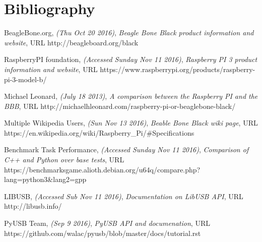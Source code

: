 \documentclass[10pt,draftclsnofoot,onecolumn]{IEEEtran}
\begin{document}
\section{Bibliography}
\begin{thebibliography}{9}

 BeagleBone.org,
\emph{(Thu Oct 20 2016)},
  \emph{Beagle Bone Black product information and website},
URL  http://beagleboard.org/black

RaspberryPI foundation,
\emph{(Accessed Sunday  Nov 11 2016)},
  \emph{Raspberry PI 3 product information and website},
URL https://www.raspberrypi.org/products/raspberry-pi-3-model-b/

Michael Leonard,
\emph{(July 18 2013)},
  \emph{A comparison between the Raspberry PI and the BBB},
URL  http://michaelhleonard.com/raspberry-pi-or-beaglebone-black/ 

Multiple Wikipedia Users,
\emph{(Sun Nov 13 2016)},
  \emph{Beable Bone Black wiki page},
URL https://en.wikipedia.org/wiki/Raspberry\_Pi/\#Specifications 

 Benchmark Task Performance,
\emph{(Accessed Sunday  Nov 11 2016)},
 \emph{Comparison of C++ and Python over base tests},
URL   https://benchmarksgame.alioth.debian.org/u64q/compare.php?lang=python3\&lang2=gpp  

LIBUSB,
\emph{(Accessed Sub Nov 11 2016)},
  \emph{Documentation on LibUSB API},
URL http://libusb.info/

PyUSB Team,
\emph{(Sep 9 2016)},
  \emph{PyUSB API and documenation},
URL https://github.com/walac/pyusb/blob/master/docs/tutorial.rst

\end{thebibliography}
\end{document}
